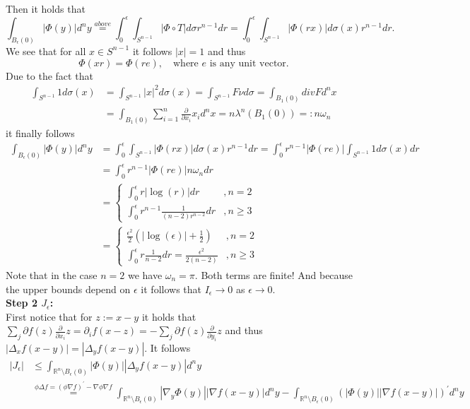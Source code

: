 \documentclass[A4,12pt,twoside]{book}
\begin{document}
{Then it holds that
\[
\int_{B_\epsilon (0)} |\Phi (y) | d^n y \stackrel{above}{=} \int_0^\epsilon \int_{S^{n-1}} |\Phi \circ T| d \sigma r^{n-1} dr = \int_0^\epsilon \int_{S^{n-1}} |\Phi (r x )| d \sigma(x) r^{n-1} dr.
\]
We see that for all $x \in S^{n-1}$ it follows $|x|=1$ and thus
\[
\Phi (x r) = \Phi (r e), \quad \text{where } e \text{ is any unit vector.}
\]
Due to the fact that
\begin{align*}
    \int_{S^{n-1}} 1 d \sigma (x) &= \int_{S^{n-1}} |x|^2 d \sigma (x) = \int_{S^{n-1}} F \nu d\sigma = \int_{B_1 (0)} div F d^n x \\
    &= \int_{B_1 (0)} \sum_{i=1}^{n} \frac{\partial}{\partial x_i} x_i d^n x = n \lambda^{n} (B_1(0)) =: n \omega_n
\end{align*}
it finally follows
\begin{align*}
\int_{B_\epsilon (0)} |\Phi (y) | d^n y& = \int_0^\epsilon \int_{S^{n-1}} |\Phi (r x )| d \sigma(x) r^{n-1} dr = \int_0^\epsilon r^{n-1} | \Phi (r e) | \int_{S^{n-1}} 1 d \sigma (x) dr \\
&= \int_0^\epsilon r^{n-1} | \Phi (r e) | n \omega_n dr \\
&= \begin{cases}
    \int_0^\epsilon r |\log (r)| dr &, n=2 \\
    \int_0^\epsilon r^{n-1} \frac{1}{ (n-2) r^{n-2}} dr &, n \geq 3
\end{cases}\\
&= \begin{cases}
    \frac{\epsilon^2}{2} ( | \log (\epsilon) | + \frac{1}{2}) &, n=2 \\
    \int_0^\epsilon r \frac{1}{ n-2} dr = \frac{\epsilon^2}{2 (n-2)} &, n \geq 3
\end{cases}
\end{align*}
Note that in the case $n=2$ we have $\omega_n = \pi$. Both terms are finite! And because the upper bounds depend on $\epsilon$ it follows that $I_\epsilon \to 0$ as $\epsilon \to 0$. \\
\textbf{Step 2 $J_\epsilon$:}\\
First notice that for $z:= x-y$ it holds that $\sum_j \partial f(z) \frac{\partial}{\partial x_i} z = \partial_i f (x-z) =- \sum_j \partial f(z) \frac{\partial}{\partial y_i} z$ and thus $|\Delta_x f(x-y) | = |\Delta_y f(x-y)|$. It follows
\begin{align*}
    |J_\epsilon | &\leq  \int_{\mathbb{R}^n \setminus B_\epsilon (0)} |\Phi (y)| | \Delta_y f(x-y) | d^n y \\
    &\stackrel{\phi \Delta f = (\phi \nabla f)^\prime - \nabla \phi \nabla f}{=}  \int_{\mathbb{R}^n \setminus B_\epsilon (0)} | \nabla_y \Phi (y)| | \nabla f(x-y) | d^n y - \int_{\mathbb{R}^n \setminus B_\epsilon (0)} (|  \Phi (y)| | \nabla f(x-y) | )^\prime  d^n y \\

\end{align*}}
\end{document}
